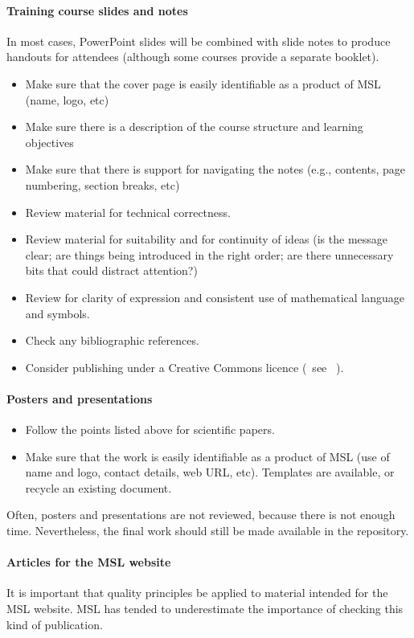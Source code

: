 \paragraph{Training course slides and notes}
In most cases, PowerPoint slides will be combined with slide notes to produce handouts for attendees (although some courses provide a separate booklet). 
\begin{itemize}
\item  Make sure that the cover page is easily identifiable as a product of MSL (name, logo, etc)
\item  Make sure there is a description of the course structure and learning objectives
\item  Make sure that there is support for navigating the notes (e.g., contents, page numbering, section breaks, etc) 
\item  Review material for technical correctness.
\item  Review material for suitability and for continuity of ideas (is the message clear; are things being introduced in the right order; are there unnecessary bits that could distract attention?)
\item  Review for clarity of expression and consistent use of mathematical language and symbols.  
\item  Check any bibliographic references. 
\item  Consider publishing under a Creative Commons licence (~see \cite[\S\ref*{GRP-s_copyright}]{MSL_Reporting_Guidelines}~).
\end{itemize}
\paragraph{Posters and presentations}
\begin{itemize}
\item  Follow the points listed above for scientific papers.
\item  Make sure that the work is easily identifiable as a product of MSL (use of name and logo, contact details, web URL, etc). Templates are available, or recycle an existing document.
\end{itemize} 

Often, posters and presentations are not reviewed, because there is not enough time. Nevertheless, the final work should still be made available in the repository. 

\paragraph{Articles for the MSL website}
It is important that quality principles be applied to material intended for the MSL website. MSL has tended to underestimate the importance of checking this kind of publication.

